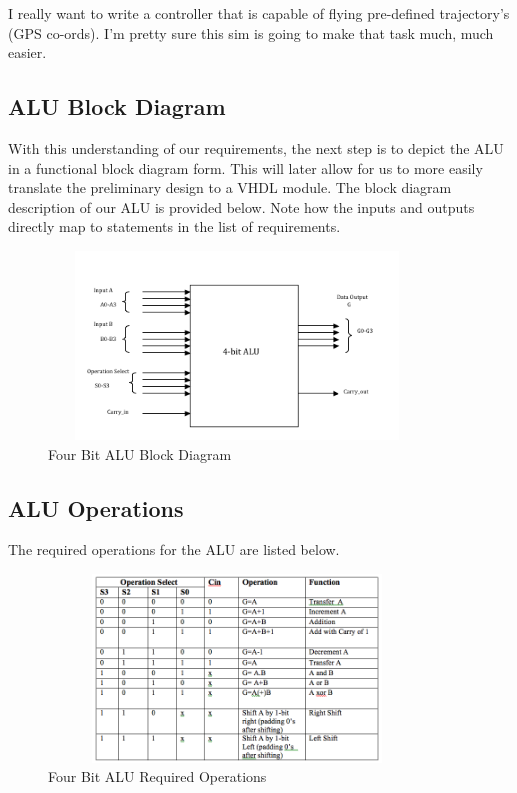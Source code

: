 \documentclass{article}
\begin{document}
I really want to write a controller that is capable of flying pre-defined trajectory's (GPS co-ords). I'm pretty sure this sim is going to make that task much, much easier.







\subsection{ALU Block Diagram}
With this understanding of our requirements, the next step is to depict the ALU in a functional block diagram form. This will later allow for us to more easily translate the preliminary design to a VHDL module. The block diagram description of our ALU is provided below. Note how the inputs and outputs directly map to statements in the list of requirements.
\begin{figure}[ht!]
\centering
\includegraphics[width=100mm, height=50mm]{images/BlockDiagramALU.png}
\caption{Four Bit ALU Block Diagram}
\label{overflow}
\end{figure}

\subsection{ALU Operations}
The required operations for the ALU are listed below.
\begin{figure}[ht!]
\centering
\includegraphics[width=100mm, height=50mm]{images/ALUOps.png}
\caption{Four Bit ALU Required Operations} 
\label{overflow}
\end{figure}
\end{document}
